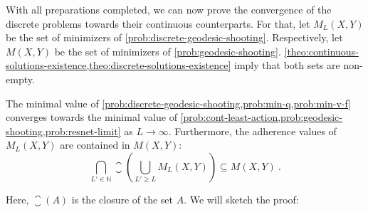 With all preparations completed, we can now prove the convergence of the discrete problems towards their continuous counterparts.
For that, let $M_L(X, Y)$ be the set of minimizers of \cref{prob:discrete-geodesic-shooting}.
Respectively, let $M(X, Y)$ be the set of minimizers of \cref{prob:geodesic-shooting}.
\cref{theo:continuous-solutions-existence,theo:discrete-solutions-existence} imply that both sets are non-empty.
\begin{theorem}
	\label{theo:problem-convergence}
	The minimal value of \cref{prob:discrete-geodesic-shooting,prob:min-q,prob:min-v-f} converges towards the minimal value of \cref{prob:cont-least-action,prob:geodesic-shooting,prob:resnet-limit} as $L \rightarrow \infty$.
	Furthermore, the adherence values of $M_L(X, Y)$ are contained in $M(X, Y)$:
	\begin{equation}
	\label{eq:limit-adherence}
		\bigcap_{L' \in \mathbb{N}} \closure\left(\bigcup_{L' \geq L} M_L(X, Y)\right) \subseteq M(X, Y) \ .
	\end{equation}
\end{theorem}
Here, $\closure (A)$ is the closure of the set $A$.
We will sketch the proof:

